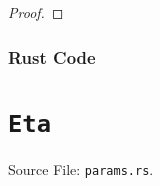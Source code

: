 \documentclass[11pt]{article}
\theoremstyle{definition}
\begin{document}
\begin{proof}

\end{proof}

\subsubsection{Rust Code}


\section{\texttt{Eta}}
Source File: \texttt{params.rs}.
\end{document}
